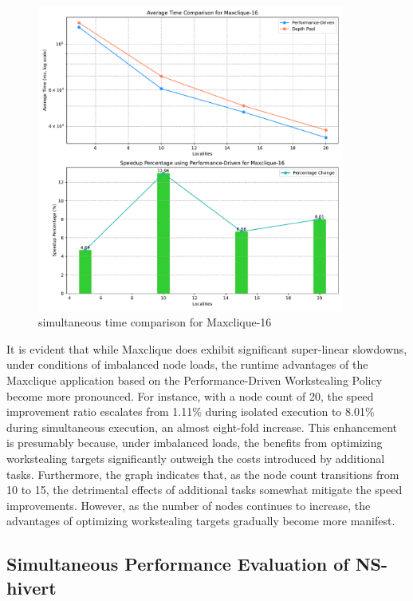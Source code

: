 \documentclass{mproj}
\begin{document}
\begin{figure}[h]
    \centering
    \includegraphics[width=0.9\textwidth]{images/time_comparison_max_simultaneously.pdf}
    \caption{simultaneous time comparison for Maxclique-16}
    \label{fig:time_comparison_max_simu}
\end{figure}
\FloatBarrier

It is evident that while Maxclique does exhibit significant super-linear slowdowns, under conditions of imbalanced node loads, the runtime advantages of the Maxclique application based on the Performance-Driven Workstealing Policy become more pronounced.
For instance, with a node count of 20, the speed improvement ratio escalates from 1.11\% during isolated execution to 8.01\% during simultaneous execution, an almost eight-fold increase.
This enhancement is presumably because, under imbalanced loads, the benefits from optimizing workstealing targets significantly outweigh the costs introduced by additional tasks.
Furthermore, the graph indicates that, as the node count transitions from 10 to 15, the detrimental effects of additional tasks somewhat mitigate the speed improvements.
However, as the number of nodes continues to increase, the advantages of optimizing workstealing targets gradually become more manifest.

\subsection{Simultaneous Performance Evaluation of NS-hivert}
\end{document}
